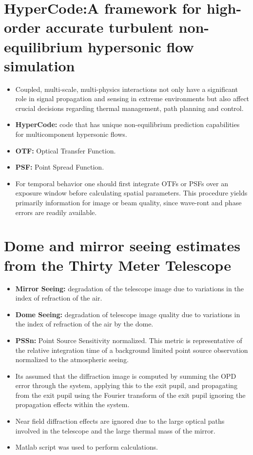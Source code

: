     \section{HyperCode:A framework for high-order accurate turbulent non-equilibrium hypersonic flow simulation \cite{doi:10.2514/6.2020-2192}} 
        \begin{itemize}
            \item Coupled, multi-scale, multi-physics interactions not only have a significant role in signal propagation and sensing in extreme environments but also affect crucial decisions regarding thermal management, path planning and control.
            \item \textbf{HyperCode:} code that has unique non-equilibrium prediction capabilities for multicomponent hypersonic flows.
            \item \textbf{OTF:} Optical Transfer Function.  
            \item \textbf{PSF:} Point Spread Function.
            \item For temporal behavior one should first integrate OTFs or PSFs over an exposure window before calculating spatial parameters. This procedure yields primarily information for image or beam quality, since wave-ront and phase errors are readily available.
        \end{itemize}
        

    \section{Dome and mirror seeing estimates from the Thirty Meter Telescope \cite{10.1117/12.789636}}
        \begin{itemize}
            \item \textbf{Mirror Seeing:} degradation of the telescope image due to variations in the index of refraction of the air. 
            \item \textbf{Dome Seeing:} degradation of telescope image quality due to variations in the index of refraction of the air by the dome. 
            \item \textbf{PSSn:} Point Source Sensitivity normalized. This metric is representative of the relative integration time of a background limited point source observation normalized to the atmospheric seeing.
            \item Its assumed that the diffraction image is computed by summing the OPD error through the system, applying this to the exit pupil, and propagating from the exit pupil using the Fourier transform of the exit pupil ignoring the propagation effects within the system. 
            \item Near field diffraction effects are ignored due to the large optical paths involved in the telescope and the large thermal mass of the mirror.
            \item Matlab script was used to perform calculations.
        \end{itemize}
    

